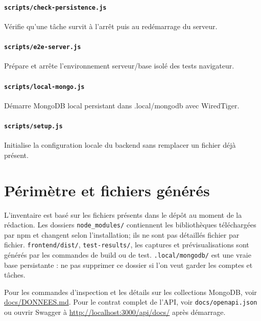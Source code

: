 \documentclass[10pt,a4paper]{article}
\begin{document}
\paragraph{\texttt{scripts/check-persistence.js}} Vérifie qu'une tâche survit à l'arrêt puis au redémarrage du serveur.
\paragraph{\texttt{scripts/e2e-server.js}} Prépare et arrête l'environnement serveur/base isolé des tests navigateur.
\paragraph{\texttt{scripts/local-mongo.js}} Démarre MongoDB local persistant dans .local/mongodb avec WiredTiger.
\paragraph{\texttt{scripts/setup.js}} Initialise la configuration locale du backend sans remplacer un fichier déjà présent.
\section*{Périmètre et fichiers générés}
L'inventaire est basé sur les fichiers présents dans le dépôt au moment de la rédaction. Les dossiers \texttt{node\_modules/} contiennent les bibliothèques téléchargées par npm et changent selon l'installation; ils ne sont pas détaillés fichier par fichier. \texttt{frontend/dist/}, \texttt{test-results/}, les captures et prévisualisations sont générés par les commandes de build ou de test. \texttt{.local/mongodb/} est une vraie base persistante : ne pas supprimer ce dossier si l'on veut garder les comptes et tâches.

Pour les commandes d'inspection et les détails sur les collections MongoDB, voir \href{DONNEES.md}{docs/DONNEES.md}. Pour le contrat complet de l'API, voir \texttt{docs/openapi.json} ou ouvrir Swagger à \url{http://localhost:3000/api/docs/} après démarrage.
\end{document}
